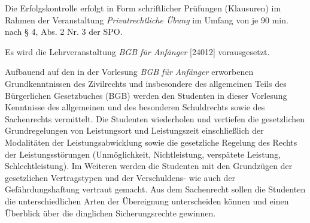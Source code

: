 \begin{course}

\setdoclanguagegerman
{}



\coursehead


\label{cour_4387.dp_997}


\begin{styleenv}
\begin{assessment}
Die Erfolgskontrolle erfolgt in Form schriftlicher Prüfungen (Klausuren) im Rahmen der Veranstaltung \emph{Privatrechtliche Übung} im Umfang von je 90 min. nach § 4, Abs. 2 Nr. 3 der SPO.


\end{assessment}

\begin{conditions}Es wird die Lehrveranstaltung \emph{BGB für Anfänger} [24012] vorausgesetzt.

\end{conditions}


\end{styleenv}

\begin{learningoutcomes}
Aufbauend auf den in der Vorlesung \emph{BGB für Anfänger} erworbenen Grundkenntnissen des Zivilrechts und insbesondere des allgemeinen Teils des Bürgerlichen Gesetzbuches (BGB) werden den Studenten in dieser Vorlesung Kenntnisse des allgemeinen und des besonderen Schuldrechts sowie des Sachenrechts vermittelt. Die Studenten wiederholen und vertiefen die gesetzlichen Grundregelungen von Leistungsort und Leistungszeit einschließlich der Modalitäten der Leistungsabwicklung sowie die gesetzliche Regelung des Rechts der Leistungsstörungen (Unmöglichkeit, Nichtleistung, verspätete Leistung, Schlechtleistung). Im Weiteren werden die Studenten mit den Grundzügen der gesetzlichen Vertragstypen und der Verschuldens- wie auch der Gefährdungshaftung vertraut gemacht. Aus dem Sachenrecht sollen die Studenten die unterschiedlichen Arten der Übereignung unterscheiden können und einen Überblick über die dinglichen Sicherungsrechte gewinnen.



\end{learningoutcomes}
\end{course}
